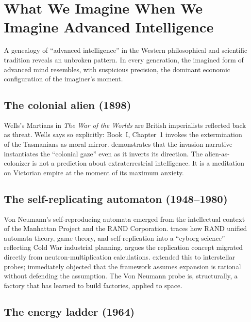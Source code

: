 \documentclass[11pt,a4paper,twocolumn]{article}
\begin{document}
\section{What We Imagine When We Imagine Advanced Intelligence}
\label{sec:genealogy}

A genealogy of ``advanced intelligence'' in the Western philosophical and
scientific tradition reveals an unbroken pattern. In every generation, the
imagined form of advanced mind resembles, with suspicious precision, the
dominant economic configuration of the imaginer's moment.

\subsection{The colonial alien (1898)}

Wells's Martians in \textit{The War of the Worlds} are British imperialists
reflected back as threat. Wells says so explicitly: Book~I, Chapter~1
invokes the extermination of the Tasmanians as moral mirror.
\citet{rieder2008} demonstrates that the invasion narrative instantiates
the ``colonial gaze'' even as it inverts its direction. The
alien-as-colonizer is not a prediction about extraterrestrial intelligence.
It is a meditation on Victorian empire at the moment of its maximum
anxiety.

\subsection{The self-replicating automaton (1948--1980)}

Von Neumann's self-reproducing automata emerged from the intellectual
context of the Manhattan Project and the RAND Corporation.
\citet{mirowski2002} traces how RAND unified automata theory, game theory,
and self-replication into a ``cyborg science'' reflecting Cold War
industrial planning. \citet{heims1980} argues the replication concept
migrated directly from neutron-multiplication calculations.
\citet{tipler1980} extended this to interstellar probes;
\citet{sagan1983} immediately objected that the framework assumes
expansion is rational without defending the assumption. The Von Neumann
probe is, structurally, a factory that has learned to build factories,
applied to space.

\subsection{The energy ladder (1964)}
\end{document}
